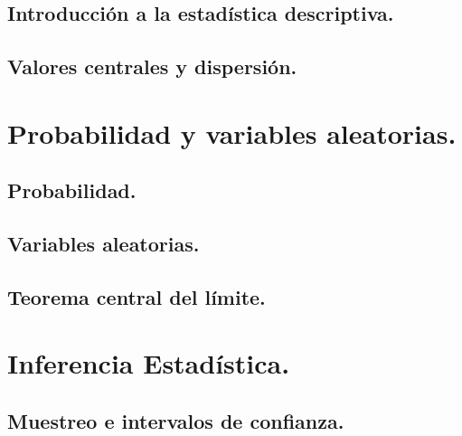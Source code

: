 \documentclass[10pt,a4paper]{book}
\begin{document}
\pagestyle{plain}



\chapter{Introducción a la estadística descriptiva.}
\label{cap:IntroduccionEstadisticaDescriptiva}


\chapter{Valores centrales y dispersión.}
\label{cap:ValoresCentralesDispersion}


\part{Probabilidad y variables aleatorias.}
\label{parte:ProbabilidadVariablesAleatorias}


\chapter{Probabilidad.}
\label{cap:Probabilidad}


\chapter{Variables aleatorias.}
\label{cap:VariablesAleatorias}


\chapter{Teorema central del límite.}
\label{cap:TeoremaCentralLimite}



\part{Inferencia Estadística.}
\label{parte:InferenciaEstadistica}


\chapter{Muestreo e intervalos de confianza.}
\label{cap:IntervalosConfianza}

\end{document}
